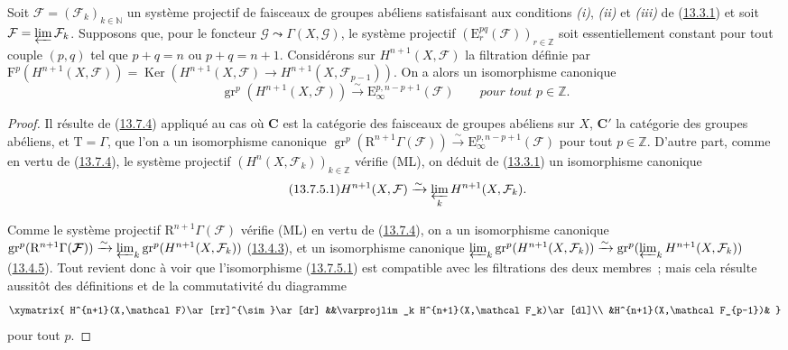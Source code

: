 \begin{corollary}[13.7.5]
\label{0.13.7.5-fr}
Soit $\boldsymbol{\mathcal F}=(\mathcal F_k)_{k\in\mathbb N}$ un système
projectif de faisceaux de groupes abéliens satisfaisant aux conditions
\emph{(i)}, \emph{(ii)} et \emph{(iii)} de
\textup{(\hyperref[0.13.3.1-fr]{13.3.1})} et soit
$\mathcal F=\varprojlim\mathcal F_k$. Supposons que, pour le foncteur
$\mathcal G\leadsto\Gamma(X,\mathcal G)$, le système projectif
$(\mathrm E_r^{pq}(\boldsymbol{\mathcal F}))_{r\in\mathbb Z}$ soit essentiellement
constant pour tout couple $(p,q)$ tel que $p+q=n$ ou $p+q=n+1$.
Considérons sur $H^{n+1}(X,\mathcal F)$ la filtration définie par
$\mathrm F^p(H^{n+1}(X,\mathcal F))=
\operatorname{Ker}(H^{n+1}(X,\mathcal F)\to
H^{n+1}(X,\mathcal F_{p-1}))$. On a alors un isomorphisme canonique
\begin{equation}
\label{0.13.7.5.1-fr}
\tag{13.7.5.1}
\operatorname{gr}^p(H^{n+1}(X,\mathcal F))
\xrightarrow{\sim}\mathrm E_\infty^{p,n-p+1}(\boldsymbol{\mathcal F})
\qquad\textit{pour tout $p\in\mathbb Z$.}
\end{equation}
\end{corollary}
\begin{proof}
Il résulte de (\hyperref[0.13.7.4-fr]{13.7.4}) appliqué au cas où $\boldsymbol{C}$
est la catégorie des faisceaux de groupes abéliens sur $X$, $\boldsymbol{C}'$ la
catégorie des groupes abéliens, et $\mathrm T=\Gamma$, que l'on a un
isomorphisme
canonique
$\operatorname{gr}^p(\mathrm R^{n+1}\Gamma(\boldsymbol{\mathcal F}))
\xrightarrow{\sim}\mathrm E_\infty^{p,n-p+1}(\boldsymbol{\mathcal F})$ pour tout
$p\in\mathbb Z$. D'autre part, comme en vertu de
(\hyperref[0.13.7.4-fr]{13.7.4}), le système projectif
$(H^n(X,\mathcal F_k))_{k\in\mathbb Z}$ vérifie (ML), on déduit de
(\hyperref[0.13.3.1-fr]{13.3.1}) un isomorphisme canonique
\begin{equation}
\label{0.13.7.5.1b-fr}
\tag{13.7.5.1}
H^{n+1}(X,\mathcal F)\xrightarrow{\sim}
\varprojlim_k H^{n+1}(X,\mathcal F_k).
\end{equation}

Comme le système projectif $\mathrm R^{n+1}\Gamma(\boldsymbol{\mathcal F})$ vérifie
(ML) en vertu de (\hyperref[0.13.7.4-fr]{13.7.4}), on a un isomorphisme
canonique
$\operatorname{gr}^p(\mathrm R^{n+1}\Gamma(\boldsymbol{\mathcal F}))
\xrightarrow{\sim}
\varprojlim_k\operatorname{gr}^p(H^{n+1}(X,\mathcal F_k))$
(\hyperref[0.13.4.3-fr]{13.4.3}), et un isomorphisme canonique
$\varprojlim_k\operatorname{gr}^p(H^{n+1}(X,\mathcal F_k))
\xrightarrow{\sim}
\operatorname{gr}^p(\varprojlim_k H^{n+1}(X,\mathcal F_k))$
(\hyperref[0.13.4.5-fr]{13.4.5}). Tout revient donc à voir que
l'isomorphisme (\hyperref[0.13.7.5.1-fr]{13.7.5.1}) est compatible avec
les filtrations des deux membres~; mais cela résulte aussitôt des
définitions et de la commutativité du diagramme
\[
\xymatrix{
H^{n+1}(X,\mathcal F)\ar[rr]^{\sim}\ar[dr]
&&\varprojlim_k H^{n+1}(X,\mathcal F_k)\ar[dl]\\
&H^{n+1}(X,\mathcal F_{p-1})&
}
\]
pour tout $p$.
\end{proof}

